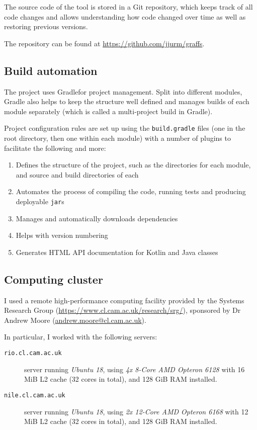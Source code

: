 The source code of the \graffs tool is stored in a Git repository, which keeps track of all code changes and allows understanding how code changed over time as well as restoring previous versions.

The repository can be found at \url{https://github.com/jjurm/graffs}.

\subsection{Build automation}

The project uses Gradle\citeneeded for project management.
Split into different modules, Gradle also helps to keep the structure well defined and manages builds of each module separately (which is called a multi-project build in Gradle).

Project configuration rules are set up using the \texttt{build.gradle} files (one in the root directory, then one within each module) with a number of plugins to facilitate the following and more:
\begin{enumerate}
    \item Defines the structure of the project, such as the directories for each module, and source and build directories of each
    \item Automates the process of compiling the code, running tests and producing deployable \texttt{jar}s
    \item Manages and automatically downloads dependencies
    \item Helps with version numbering
    \item Generates HTML API documentation for Kotlin and Java classes
\end{enumerate}



\subsection{Computing cluster}\label{sec:computing_cluster}

I used a remote high-performance computing facility provided by the Systems Research Group (\url{https://www.cl.cam.ac.uk/research/srg/}), sponsored by Dr Andrew Moore (\url{andrew.moore@cl.cam.ac.uk}).

In particular, I worked with the following servers:

\begin{description}
    \item[\texttt{rio.cl.cam.ac.uk}] server running \textsl{Ubuntu 18}, using \textsl{4x 8-Core AMD Opteron 6128} with 16 MiB L2 cache (32 cores in total), and 128 GiB RAM installed.
    \item[\texttt{nile.cl.cam.ac.uk}] server running \textsl{Ubuntu 18}, using \textsl{2x 12-Core AMD Opteron 6168} with 12 MiB L2 cache (32 cores in total), and 128 GiB RAM installed.
\end{description}

